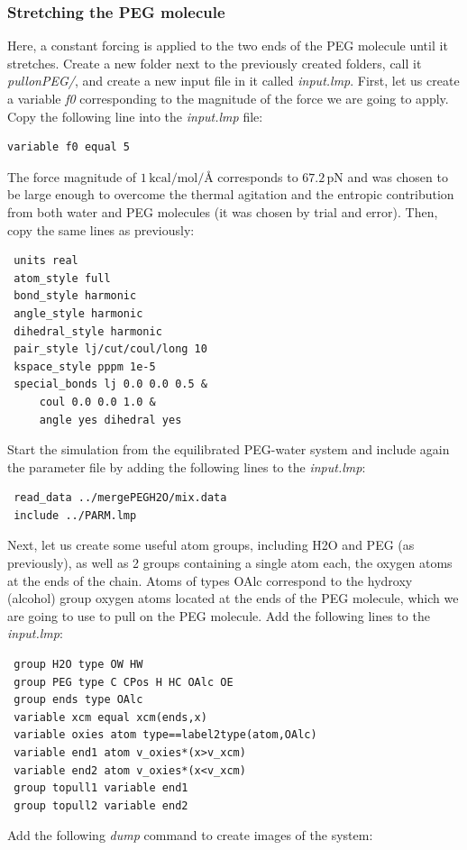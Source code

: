 \documentclass[9pt,tutorial]{livecoms}
\begin{document}
\subsubsection{Stretching the PEG molecule}
Here, a constant forcing is applied to the two ends of the PEG molecule until it
stretches. Create a new folder next to the previously created folders, call it
\textit{pullonPEG/}, and create a new input file in it called \textit{input.lmp}.
First, let us create a variable \textit{f0} corresponding to the magnitude of the
force we are going to apply. Copy the following line into the \textit{input.lmp} file:
\begin{lstlisting}
variable f0 equal 5
\end{lstlisting}
The force magnitude of $1\,\text{kcal/mol/\AA{}}$ corresponds to $67.2\,\text{pN}$
and was chosen to be large enough to overcome the thermal agitation and the entropic
contribution from both water and PEG molecules (it was chosen by trial and error).
Then, copy the same lines as previously:
\begin{lstlisting}
 units real
 atom_style full
 bond_style harmonic
 angle_style harmonic
 dihedral_style harmonic
 pair_style lj/cut/coul/long 10
 kspace_style pppm 1e-5
 special_bonds lj 0.0 0.0 0.5 &
     coul 0.0 0.0 1.0 &
     angle yes dihedral yes
\end{lstlisting}
Start the simulation from the equilibrated PEG-water system and include again the
parameter file by adding the following lines to the \textit{input.lmp}:
\begin{lstlisting}
 read_data ../mergePEGH2O/mix.data
 include ../PARM.lmp
\end{lstlisting}
Next, let us create some useful atom groups, including H2O and PEG (as previously),
as well as 2 groups containing a single atom each, the oxygen atoms at the ends
of the chain. Atoms of types OAlc correspond to the hydroxy (alcohol) group oxygen
atoms located at the ends of the PEG molecule, which we are going to use to pull
on the PEG molecule. Add the following lines to the \textit{input.lmp}:
\begin{lstlisting}
 group H2O type OW HW
 group PEG type C CPos H HC OAlc OE
 group ends type OAlc
 variable xcm equal xcm(ends,x)
 variable oxies atom type==label2type(atom,OAlc)
 variable end1 atom v_oxies*(x>v_xcm)
 variable end2 atom v_oxies*(x<v_xcm)
 group topull1 variable end1
 group topull2 variable end2
\end{lstlisting}
Add the following \textit{dump} command to create images of the system:
\end{document}
